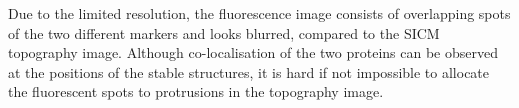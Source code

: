 Due to the limited resolution, the fluorescence image consists of overlapping
spots of the two different markers and looks blurred, compared to the
SICM topography image. Although co-localisation of the two proteins can be
observed at the positions of the stable structures, it is hard if not
impossible to allocate the fluorescent spots to protrusions in the topography
image.

